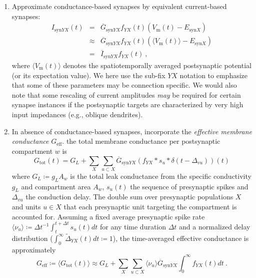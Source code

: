 \begin{enumerate}
\item Approximate conductance-based synapses by equivalent current-based synapses:
\begin{eqnarray}
I_{\mathrm{syn}YX}(t)
	&=& \overline{G}_{\mathrm{syn}YX}f_{YX}(t)\left(V_\mathrm{m}(t) - E_{\mathrm{syn}X}\right) \\
	&\approx& \overline{G}_{\mathrm{syn}YX}f_{YX}(t)\left(\langle V_\mathrm{m}(t) \rangle - E_{\mathrm{syn}X}\right) \\
	&=& \overline{I}_{\mathrm{syn}YX}f_{YX}(t)~,
\end{eqnarray}
where $\langle V_\mathrm{m}(t) \rangle$ denotes the spatiotemporally averaged postsynaptic potential (or its expectation value).
We here use the sub-fix $YX$ notation to emphasize that some of these parameters may be connection specific.
We would also note that some rescaling of current amplitudes \emph{may} be required for certain synapse instances if the postsynaptic targets are characterized by very high input impedances (e.g., oblique dendrites).

\item In absence of conductance-based synapses, incorporate the \emph{effective membrane conductance} $G_\mathrm{eff}$.
  the total membrane conductance per postsynaptic compartment $w$ is
\begin{equation}
G_{\mathrm{tot}}(t) = G_L + \sum_X \sum_{u \subset X} \overline{G}_{\mathrm{syn}YX} \left( f_{YX} \ast s_u \ast \delta(t-\Delta_{vu}) \right)(t)
\end{equation}
where $G_L \coloneq g_L A_w$ is the total leak conductance from the specific conductivity $g_L$ and compartment area $A_w$, $s_u(t)$ the sequence of presynaptic spikes and $\Delta_{vu}$ the conduction delay. The double sum over presynaptic populations $X$ and units $u \in X$  that each presynaptic unit targeting the compartment is accounted for. Assuming a fixed average presynaptic spike rate $\langle \nu_u \rangle \coloneq \Delta t^{-1} \int_t^{t+\Delta t} s_u(t) dt$ for any time duration $\Delta t$ and a normalized delay distribution ($\int_0^\infty \widetilde{\Delta}_{YX}(t) dt \coloneq 1$), the time-averaged effective conductance is approximately
\begin{equation}
G_\mathrm{eff} \coloneq \langle G_\mathrm{tot}(t) \rangle \approx G_L + \sum_X \sum_{u \subset X} \langle \nu_u \rangle \overline{G}_{\mathrm{syn}YX} \int_0^\infty f_{YX}(t) dt ~.
\end{equation}


\end{enumerate}

